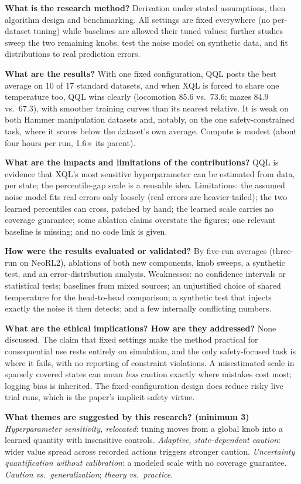 \documentclass[11pt]{article}
\newcommand{\q}[2]{\item \textbf{#1} #2}
\begin{document}
\begin{qna}
\q{What is the research method?}
Derivation under stated assumptions, then algorithm design and benchmarking. All settings are fixed everywhere (no per-dataset tuning) while baselines are allowed their tuned values; further studies sweep the two remaining knobs, test the noise model on synthetic data, and fit distributions to real prediction errors.

\q{What are the results?}
With one fixed configuration, QQL posts the best average on 10 of 17 standard datasets, and when XQL is forced to share one temperature too, QQL wins clearly (locomotion 85.6 vs.\ 73.6; mazes 84.9 vs.\ 67.3), with smoother training curves than its nearest relative. It is weak on both Hammer manipulation datasets and, notably, on the one safety-constrained task, where it scores below the dataset's own average. Compute is modest (about four hours per run, 1.6$\times$ its parent).

\q{What are the impacts and limitations of the contributions?}
QQL is evidence that XQL's most sensitive hyperparameter can be estimated from data, per state; the percentile-gap scale is a reusable idea. Limitations: the assumed noise model fits real errors only loosely (real errors are heavier-tailed); the two learned percentiles can cross, patched by hand; the learned scale carries no coverage guarantee; some ablation claims overstate the figures; one relevant baseline is missing; and no code link is given.

\q{How were the results evaluated or validated?}
By five-run averages (three-run on NeoRL2), ablations of both new components, knob sweeps, a synthetic test, and an error-distribution analysis. Weaknesses: no confidence intervals or statistical tests; baselines from mixed sources; an unjustified choice of shared temperature for the head-to-head comparison; a synthetic test that injects exactly the noise it then detects; and a few internally conflicting numbers.

\q{What are the ethical implications? How are they addressed?}
None discussed. The claim that fixed settings make the method practical for consequential use rests entirely on simulation, and the only safety-focused task is where it fails, with no reporting of constraint violations. A misestimated scale in sparsely covered states can mean \emph{less} caution exactly where mistakes cost most; logging bias is inherited. The fixed-configuration design does reduce risky live trial runs, which is the paper's implicit safety virtue.

\q{What themes are suggested by this research? (minimum 3)}
\emph{Hyperparameter sensitivity, relocated}: tuning moves from a global knob into a learned quantity with insensitive controls. \emph{Adaptive, state-dependent caution}: wider value spread across recorded actions triggers stronger caution. \emph{Uncertainty quantification without calibration}: a modeled scale with no coverage guarantee. \emph{Caution vs.\ generalization}; \emph{theory vs.\ practice}.

\end{qna}
\end{document}
